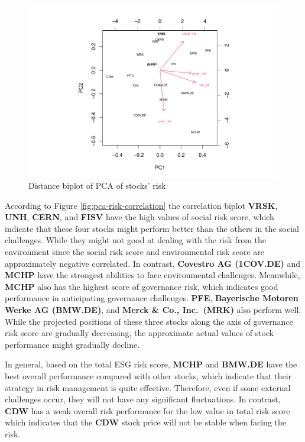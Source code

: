 \documentclass[11pt,a4paper,]{article}
\begin{document}
\begin{figure}
\centering
\includegraphics{ass2_files/figure-latex/pca-risk-distance-1.pdf}
\caption{\label{fig:pca-risk-distance}Distance biplot of PCA of stocks' risk}
\end{figure}

According to Figure \ref{fig:pca-risk-correlation} the correlation biplot \textbf{VRSK}, \textbf{UNH}, \textbf{CERN}, and \textbf{FISV} have the high values of social risk score, which indicate that these four stocks might perform better than the others in the social challenges. While they might not good at dealing with the risk from the environment since the social risk score and environmental risk score are approximately negative correlated. In contrast, \textbf{Covestro AG (1COV.DE)} and \textbf{MCHP} have the strongest abilities to face environmental challenges. Meanwhile, \textbf{MCHP} also has the highest score of governance risk, which indicates good performance in anticipating governance challenges. \textbf{PFE}, \textbf{Bayerische Motoren Werke AG (BMW.DE)}, and \textbf{Merck \& Co., Inc.~(MRK)} also perform well. While the projected positions of these three stocks along the axis of governance risk score are gradually decreasing, the approximate actual values of stock performance might gradually decline.

In general, based on the total ESG risk score, \textbf{MCHP} and \textbf{BMW.DE} have the best overall performance compared with other stocks, which indicate that their strategy in risk management is quite effective. Therefore, even if some external challenges occur, they will not have any significant fluctuations. In contrast, \textbf{CDW} has a weak overall risk performance for the low value in total risk score which indicates that the \textbf{CDW} stock price will not be stable when facing the risk.
\end{document}
